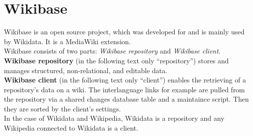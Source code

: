 \section{Wikibase}
Wikibase is an open source project, which was developed for and is mainly used by Wikidata. It is a MediaWiki extension. \\
Wikibase consists of two parts: \textit{Wikibase repository} and \textit{Wikibase client}. \textbf{Wikibase repository} (in the following text only ``repository'')  stores and manages structured, non-relational, and editable data. \citep{wikibase:01} \\
\textbf{Wikibase client} (in the following text only ``client'') enables the retrieving of a repository's data on a wiki. \citep{wikibase:01} The interlanguage links for example are pulled from the repository via a shared changes database table and a maintaince script. Then they are sorted by the client's settings. \citep{wiki:18} \\
In the case of Wikidata and Wikipedia, Wikidata is a repository and any Wikipedia connected to Wikidata is a client.